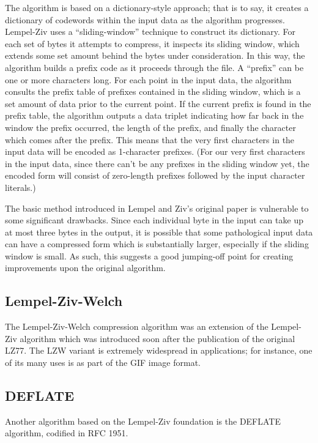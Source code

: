 \documentclass[12pt]{article}
\begin{document}
The algorithm is based on a dictionary-style approach; that is to say,
it creates a dictionary of codewords within the input data as the
algorithm progresses. Lempel-Ziv uses a ``sliding-window'' technique
to construct its dictionary. For each set of bytes it attempts to
compress, it inspects its sliding window, which extends some set
amount behind the bytes under consideration. In this way, the
algorithm builds a prefix code as it proceeds through the file. A
``prefix'' can be one or more characters long. For each point in the
input data, the algorithm consults the prefix table of prefixes
contained in the sliding window, which is a set amount of data prior
to the current point. If the current prefix is found in the prefix
table, the algorithm outputs a data triplet indicating how far back in
the window the prefix occurred, the length of the prefix, and finally
the character which comes after the prefix. This means that the very
first characters in the input data will be encoded as 1-character
prefixes. (For our very first characters in the input data, since
there can't be any prefixes in the sliding window yet, the encoded
form will consist of zero-length prefixes followed by the input
character literals.)

The basic method introduced in Lempel and Ziv's original paper is
vulnerable to some significant drawbacks. Since each individual byte
in the input can take up at most three bytes in the output, it is
possible that some pathological input data can have a compressed form
which is substantially larger, especially if the sliding window is
small. As such, this suggests a good jumping-off point for creating
improvements upon the original algorithm.

\subsection{Lempel-Ziv-Welch}

The Lempel-Ziv-Welch compression algorithm was an extension of the
Lempel-Ziv algorithm which was introduced soon after the publication
of the original LZ77. \cite{LempelZivWelch} The LZW variant is
extremely widespread in applications; for instance, one of its many
uses is as part of the GIF image format.

\subsection{DEFLATE}

Another algorithm based on the Lempel-Ziv foundation is the DEFLATE
algorithm, codified in RFC 1951. \cite{RFC1951}
\end{document}
